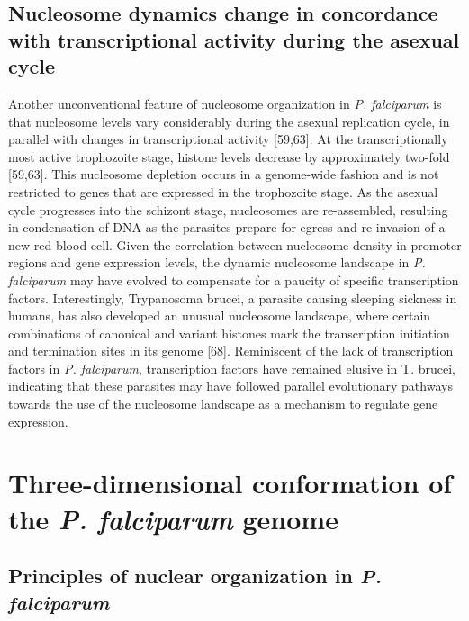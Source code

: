 \subsection{Nucleosome dynamics change in concordance with transcriptional
activity during the asexual cycle}

Another unconventional feature of nucleosome organization in \textit{P.
falciparum} is that nucleosome levels vary considerably during the asexual
replication cycle, in parallel with changes in transcriptional activity
[59,63]. At the transcriptionally most active trophozoite stage, histone
levels decrease by approximately two-fold [59,63]. This nucleosome depletion
occurs in a genome-wide fashion and is not restricted to genes that are
expressed in the trophozoite stage. As the asexual cycle progresses into the
schizont stage, nucleosomes are re-assembled, resulting in condensation of DNA
as the parasites prepare for egress and re-invasion of a new red blood cell.
Given the correlation between nucleosome density in promoter regions and gene
expression levels, the dynamic nucleosome landscape in \textit{P. falciparum} may have
evolved to compensate for a paucity of specific transcription factors.
Interestingly, Trypanosoma brucei, a parasite causing sleeping sickness in
humans, has also developed an unusual nucleosome landscape, where certain
combinations of canonical and variant histones mark the transcription
initiation and termination sites in its genome [68]. Reminiscent of the lack
of transcription factors in \textit{P. falciparum}, transcription factors have remained
elusive in T. brucei, indicating that these parasites may have followed
parallel evolutionary pathways towards the use of the nucleosome landscape as
a mechanism to regulate gene expression.


\section{Three-dimensional conformation of the \textit{P. falciparum} genome}

\subsection{Principles of nuclear organization in \textit{P. falciparum}}


